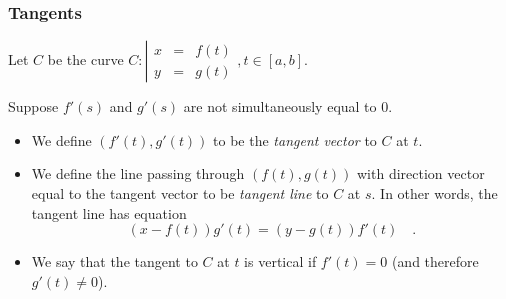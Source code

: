 \begin{frame}
\frametitle{Tangents}
Let $C $ be the curve $C:\left|\begin{array}{rcl}x&=&f(t)\\y&=&g(t)\end{array} \right., t\in [a,b]$.
\begin{definition}
Suppose \alert<4>{ $f'(s)$ and $g'(s)$ are not simultaneously equal to $0$.} 
\begin{itemize}
\item  We define $(f'(t), g'(t))$ to be the \emph{tangent vector} to $C$ at $t$.
\item<2->  We define the line passing through $(f(t), g(t))$ with direction vector equal to the tangent vector to be \emph{tangent line} to $C$ at $s$. In other words, the tangent line has equation
\[
(x-f(t))g'(t) =(y-g(t))f'(t)\quad .
\]
\item<3->  We say that the tangent to $C$ at $t$ is vertical if $f'(t)=0$ (\alert<4>{and therefore $g'(t)\neq 0$}).
\end{itemize}
\end{definition}
\end{frame}
\begin{frame}
\begin{example}

\end{example}
\end{frame}

